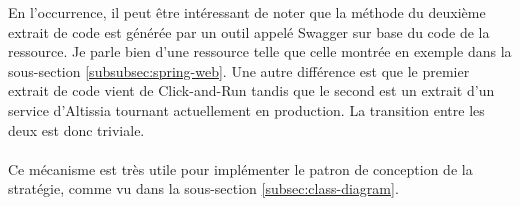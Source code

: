 En l'occurrence, il peut être intéressant de noter que la méthode du deuxième extrait de code est générée par un outil appelé Swagger sur base du code de la ressource.
Je parle bien d'une ressource telle que celle montrée en exemple dans la sous-section \ref{subsubsec:spring-web}.
Une autre différence est que le premier extrait de code vient de Click-and-Run tandis que le second est un extrait d'un service d'Altissia tournant actuellement en production.
La transition entre les deux est donc triviale.

\paragraph{}
Ce mécanisme est très utile pour implémenter le patron de conception de la stratégie, comme vu dans la sous-section \ref{subsec:class-diagram}.

